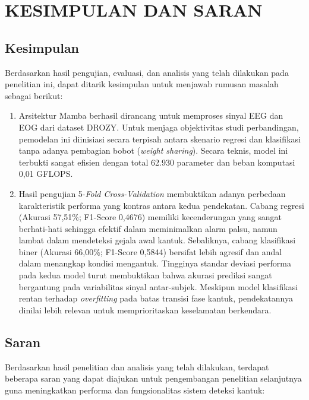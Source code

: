 \newpage
\chapter{KESIMPULAN DAN SARAN} \label{Bab V}

\section{Kesimpulan}
Berdasarkan hasil pengujian, evaluasi, dan analisis yang telah dilakukan pada penelitian ini, dapat ditarik kesimpulan untuk menjawab rumusan masalah sebagai berikut:

\begin{enumerate}
    \item Arsitektur Mamba berhasil dirancang untuk memproses sinyal EEG dan EOG dari dataset DROZY. Untuk menjaga objektivitas studi perbandingan, pemodelan ini diinisiasi secara terpisah antara skenario regresi dan klasifikasi tanpa adanya pembagian bobot (\textit{weight sharing}). Secara teknis, model ini terbukti sangat efisien dengan total 62.930 parameter dan beban komputasi 0,01 GFLOPS.
    
    \item Hasil pengujian 5-\textit{Fold Cross-Validation} membuktikan adanya perbedaan karakteristik performa yang kontras antara kedua pendekatan. Cabang regresi (Akurasi 57,51\%; F1-Score 0,4676) memiliki kecenderungan yang sangat berhati-hati sehingga efektif dalam meminimalkan alarm palsu, namun lambat dalam mendeteksi gejala awal kantuk. Sebaliknya, cabang klasifikasi biner (Akurasi 66,00\%; F1-Score 0,5844) bersifat lebih agresif dan andal dalam menangkap kondisi mengantuk. Tingginya standar deviasi performa pada kedua model turut membuktikan bahwa akurasi prediksi sangat bergantung pada variabilitas sinyal antar-subjek. Meskipun model klasifikasi rentan terhadap \textit{overfitting} pada batas transisi fase kantuk, pendekatannya dinilai lebih relevan untuk memprioritaskan keselamatan berkendara.
\end{enumerate}

\section{Saran}

Berdasarkan hasil penelitian dan analisis yang telah dilakukan, terdapat beberapa saran yang dapat diajukan untuk pengembangan penelitian selanjutnya guna meningkatkan performa dan fungsionalitas sistem deteksi kantuk:

